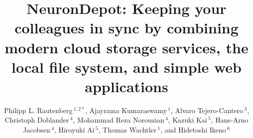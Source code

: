 \documentclass{frontiersSCNS} %
\def\firstAuthorLast{Rautenberg {et~al.}} %
\def\Authors{
Philipp L. Rautenberg\,$^{1,2*}$,
Ajayrama Kumaraswamy\,$^{1}$,
Alvaro Tejero-Cantero\,$^{3}$,
Christoph Doblander\,$^{4}$,
Mohammad Reza Norouzian\,$^{4}$,
Kazuki Kai\,$^{5}$,
Hans-Arno Jacobsen\,$^{4}$,
Hiroyuki Ai\,$^{5}$,
Thomas Wachtler\,$^{1}$,
and Hidetoshi Ikeno\,$^6$}
\begin{document}
\onecolumn
{}

\title[NeuronDepot: Keeping your colleagues in sync]{NeuronDepot: Keeping
your colleagues in sync by combining modern cloud storage services, the local
file system, and simple web applications}
\author[\firstAuthorLast ]{\Authors}
\address{}
\correspondance{}
\extraAuth{}%

\maketitle

\end{document}
